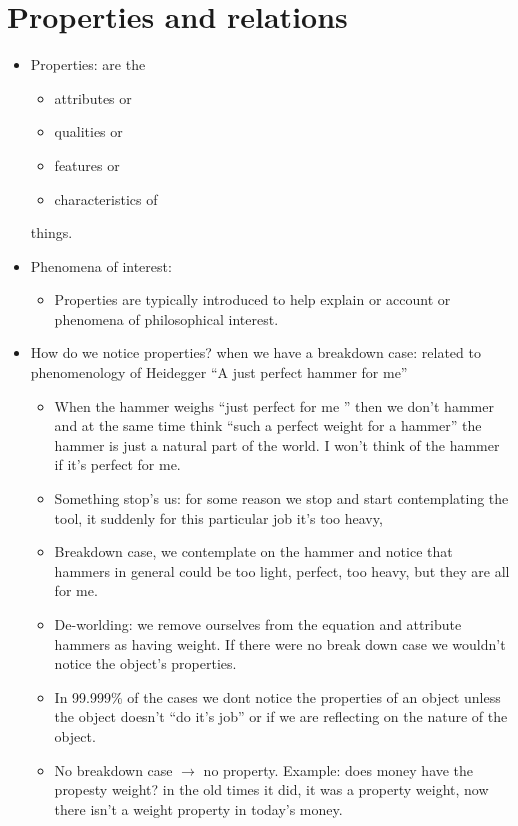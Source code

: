 \section{Properties and relations}
\begin{itemize}
    \item Properties: are the 
        \begin{itemize}
            \item attributes or 
            \item qualities or 
            \item features or 
            \item characteristics of 
        \end{itemize}
        things.
    
    \item Phenomena of interest: 
        \begin{itemize}
            \item Properties are typically introduced to help explain or account or phenomena of philosophical interest. 
        \end{itemize}
    
    \item How do we notice properties? when we have a breakdown case: related to phenomenology of Heidegger ``A just perfect hammer for me''
        \begin{itemize}
            \item When the hammer weighs ``just perfect for me '' then we don't hammer and at the same time think ``such a perfect weight for a hammer'' the hammer is just a natural part of the world. I won't think of the hammer if it's perfect for me.
            \item Something stop's us: for some reason we stop and start contemplating the tool, it suddenly for this particular job it's too heavy,
            \item Breakdown case, we contemplate on the hammer and notice that hammers in general could be too light, perfect, too heavy, but they are all for me.
            \item De-worlding: we remove ourselves from the equation and attribute hammers as having weight. If there were no break down case we wouldn't notice the object's properties.
            \item In 99.999\% of the cases we dont notice the properties of an object unless the object doesn't ``do it's job'' or if we are reflecting on the nature of the object.
            \item No breakdown case $\rightarrow$ no property. Example: does money have the propesty weight? in the old times it did, it was a property weight, now there isn't a weight property in today's money.
        \end{itemize}
    

\end{itemize}
